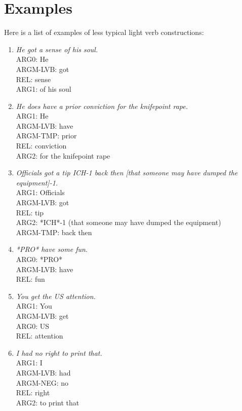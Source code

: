 \documentclass[11pt]{report}
\begin{document}
\section{Examples}
Here is a list of examples of less typical light verb constructions: 
\begin{enumerate}
\item \textit{He got a sense of his soul.}\\
ARG0: He\\
ARGM-LVB: got\\
REL: sense\\
ARG1: of his soul

\item \textit{He does have a prior conviction for the knifepoint rape.}\\
ARG1: He\\
ARGM-LVB: have\\
ARGM-TMP: prior\\
REL: conviction\\
ARG2: for the knifepoint rape

\item \textit{Officials got a tip ICH-1 back then [that someone may have dumped the equipment]-1.} \\
ARG1: Officials\\
ARGM-LVB: got\\
REL: tip\\
ARG2: *ICH*-1 (that someone may have dumped the equipment)\\
ARGM-TMP: back then

\item \textit{*PRO* have some fun.}\\
ARG0: *PRO*\\
ARGM-LVB: have\\
REL: fun

\item \textit{You get the US attention.}\\
ARG1: You\\
ARGM-LVB: get\\
ARG0: US\\
REL: attention

\item \textit{I had no right to print that.}\\
ARG1: I\\
ARGM-LVB: had\\
ARGM-NEG: no\\
REL: right\\
ARG2: to print that


\end{enumerate}
\end{document}
